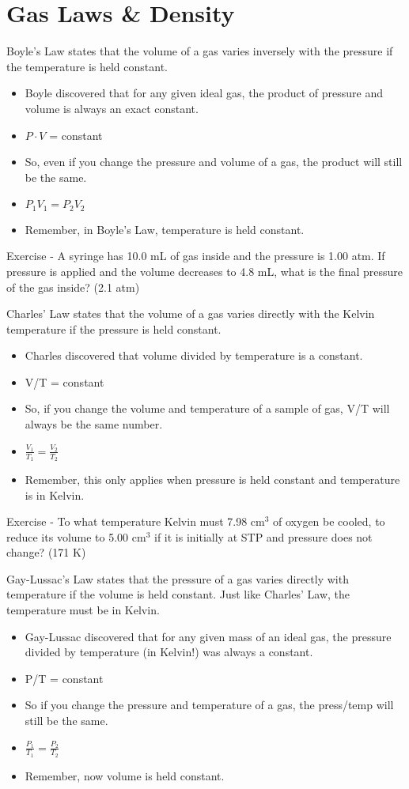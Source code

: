 \documentclass[../hchem.tex]{subfiles}
\begin{document}
\section{Gas Laws \& Density}
Boyle's Law states that the volume of a gas varies inversely with the pressure if the temperature is held constant.
\begin{itemize}
    \item Boyle discovered that for any given ideal gas, the product of pressure and volume is always an exact constant.
    \item $P\cdot V$ = constant 
    \item So, even if you change the pressure and volume of a gas, the product will still be the same.
    \item $P_1V_1=P_2V_2$
    \item Remember, in Boyle's Law, temperature is held constant.
\end{itemize}

Exercise - A syringe has 10.0 mL of gas inside and the pressure is 1.00 atm. If pressure is applied and the volume decreases to 4.8 mL, what is the final pressure of the gas inside? (2.1 atm)

Charles' Law states that the volume of a gas varies directly with the Kelvin temperature if the pressure is held constant.
\begin{itemize}
    \item Charles discovered that volume divided by temperature is a constant.
    \item V/T = constant 
    \item So, if you change the volume and temperature of a sample of gas, V/T will always be the same number.
    \item $\frac{V_1}{T_1}=\frac{V_2}{T_2}$
    \item Remember, this only applies when pressure is held constant and temperature is in Kelvin.
\end{itemize}

Exercise - To what temperature Kelvin must 7.98 cm$^3$ of oxygen be cooled, to reduce its volume to 5.00 cm$^3$ if it is initially at STP and pressure does not change? (171 K)

Gay-Lussac's Law states that the pressure of a gas varies directly with temperature if the volume is held constant. Just like Charles' Law, the temperature must be in Kelvin.
\begin{itemize}
    \item Gay-Lussac discovered that for any given mass of an ideal gas, the pressure divided by temperature (in Kelvin!) was always a constant.
    \item P/T = constant 
    \item So if you change the pressure and temperature of a gas, the press/temp will still be the same.
    \item $\frac{P_1}{T_1}=\frac{P_2}{T_2}$
    \item Remember, now volume is held constant.
\end{itemize}
\end{document}
